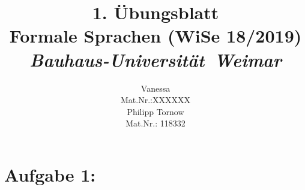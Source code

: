 \documentclass[11pt]{article}
\theoremstyle{definition}
\theoremstyle{remark}
\begin{document}
    \title{1. Übungsblatt\\
    Formale Sprachen (WiSe 18/2019)\\
    \textit{Bauhaus-Universität\ Weimar\\}
    }
    \author{Vanessa\\
    \vspace{5mm}
    \normalsize Mat.Nr.:XXXXXX\\
    \large Philipp Tornow\\
    \vspace {5mm}
    \normalsize Mat.Nr.: 118332\\
    }

    \maketitle

    \newpage
    \section*{Aufgabe 1:}
\end{document}
